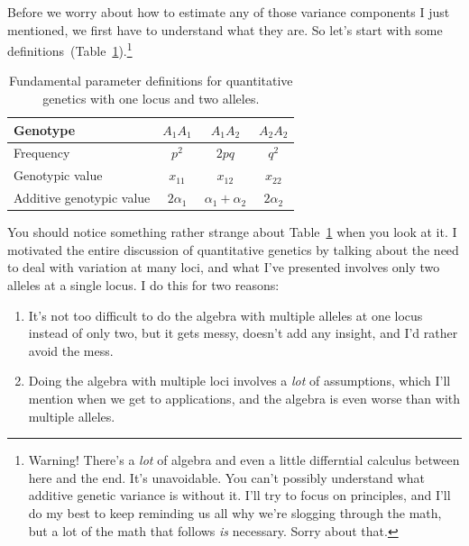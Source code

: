 \documentclass[12pt]{article}
\begin{document}
Before we worry about how to estimate any of those variance components
I just mentioned, we first have to understand what they are. So let's
start with some
definitions~(Table~\ref{table:definitions}).\footnote{Warning! There's
  a {\it lot\/} of algebra and even a little differntial calculus
  between here and the end. It's unavoidable. You can't possibly
  understand what additive genetic variance is without it. I'll try to
  focus on principles, and I'll do my best to keep reminding us all
  why we're slogging through the math, but a lot of the math that
  follows {\it is\/} necessary. Sorry about that.}

\begin{table}
\begin{center}
\begin{tabular}{l|ccc}
\hline\hline
Genotype                 & $A_1A_1$    & $A_1A_2$ & $A_2A_2$ \\
\hline
Frequency                & $p^2$       & $2pq$    & $q^2$ \\
Genotypic value          & $x_{11}$    & $x_{12}$ & $x_{22}$ \\
Additive genotypic value & $2\alpha_1$ & $\alpha_1 + \alpha_2$
                                                  & $2\alpha_2$ \\
\hline
\end{tabular}
\end{center}
\caption{Fundamental parameter definitions for quantitative genetics
  with one locus and two alleles.}\label{table:definitions}
\end{table}

You should notice something rather strange about
Table~\ref{table:definitions} when you look at it. I motivated the
entire discussion of quantitative genetics by talking about the need
to deal with variation at many loci, and what I've presented involves
only two alleles at a single locus. I do this for two reasons:

\begin{enumerate}

\item It's not too difficult to do the algebra with multiple alleles
  at one locus instead of only two, but it gets messy, doesn't add any
  insight, and I'd rather avoid the mess.

\item Doing the algebra with multiple loci involves a {\it lot\/} of
  assumptions, which I'll mention when we get to applications, and the
  algebra is even worse than with multiple alleles.

\end{enumerate}
\end{document}
